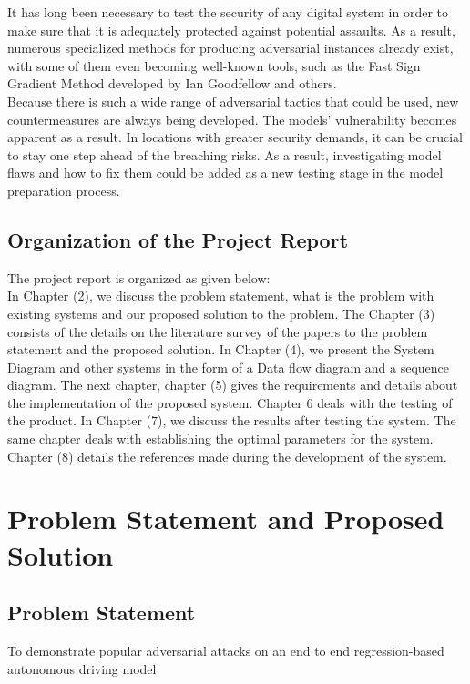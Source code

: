 \documentclass[ 12pt,a4paper,twocolumn,fleqn]{article}
\begin{document}
\begin{enumerate}
    It has long been necessary to test the security of any digital system in order to make sure that it is adequately protected against potential assaults. As a result, numerous specialized methods for producing adversarial instances already exist, with some of them even becoming well-known tools, such as the Fast Sign Gradient Method developed by Ian Goodfellow and others.\\
    Because there is such a wide range of adversarial tactics that could be used, new countermeasures are always being developed. The models' vulnerability becomes apparent as a result. In locations with greater security demands, it can be crucial to stay one step ahead of the breaching risks. As a result, investigating model flaws and how to fix them could be added as a new testing stage in the model preparation process.\\
\end{enumerate}
\subsection{Organization of the Project Report}
The project report is organized as given below: \\
%
In Chapter (2), we discuss the problem statement, what is the problem with existing systems and our proposed solution to the problem. The Chapter (3) consists of the details on the literature survey of the papers to the problem statement and the proposed solution. In Chapter (4), we present the System Diagram and other systems in the form of a Data flow diagram and a sequence diagram. The next chapter, chapter (5) gives the requirements and details about the implementation of the proposed system. Chapter 6 deals with the testing of the product. In Chapter (7), we discuss the results after testing the system. The same chapter deals with establishing the optimal parameters for the system. Chapter (8) details the references made during the development of the system.\\
%
\newpage
\section{Problem Statement and Proposed Solution}
\subsection{Problem Statement}
To demonstrate popular adversarial attacks on an end to end regression-based autonomous driving model\\
\end{document}
